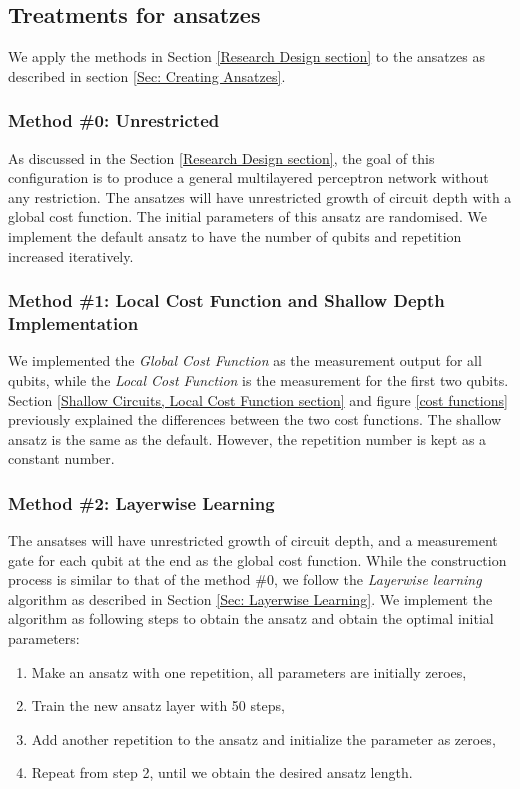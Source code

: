 \subsection{Treatments for ansatzes} \label{Sec: Treatments for ansatzes}
We apply the methods in Section \ref{Research Design section} to the ansatzes as described in section \ref{Sec: Creating Ansatzes}.

\subsubsection{Method \#0: Unrestricted} \label{Sec: Method0}
As discussed in the Section \ref{Research Design section}, the goal of this configuration is to produce a general multilayered perceptron network without any restriction.
The ansatzes will have unrestricted growth of circuit depth with a global cost function.
The initial parameters of this ansatz are randomised.
We implement the default ansatz to have the number of qubits and repetition increased iteratively.

\subsubsection{Method \#1: Local Cost Function and Shallow Depth Implementation} \label{Sec: Method1}
We implemented the \textit{Global Cost Function} as the measurement output for all qubits, while the \textit{Local Cost Function} is the measurement for the first two qubits.
Section \ref{Shallow Circuits, Local Cost Function section} and figure \ref{cost functions} previously explained the differences between the two cost functions.
The shallow ansatz is the same as the default.
However, the repetition number is kept as a constant number.

\subsubsection{Method \#2: Layerwise Learning} \label{Sec: Method2}
The ansatses will have unrestricted growth of circuit depth, and a measurement gate for each qubit at the end as the global cost function.
While the construction process is similar to that of the method \#0, we follow the \emph{Layerwise learning} algorithm as described in Section \ref{Sec: Layerwise Learning}.
We implement the algorithm as following steps to obtain the ansatz and obtain the optimal initial parameters:
\begin{enumerate}
    \item Make an ansatz with one repetition, all parameters are initially zeroes,
    \item Train the new ansatz layer with 50 steps,
    \item Add another repetition to the ansatz and initialize the parameter as zeroes,
    \item Repeat from step 2, until we obtain the desired ansatz length.
\end{enumerate}

